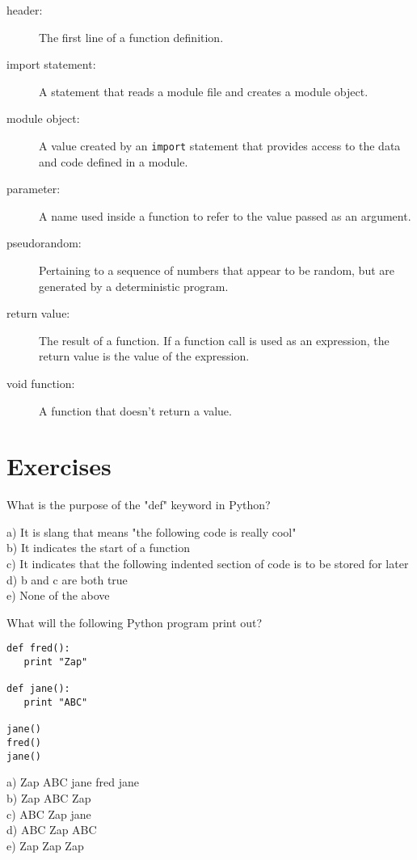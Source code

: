 \begin{description}
\item[header:] The first line of a function definition.

\item[import statement:] A statement that reads a module file and creates
a module object.

\item[module object:] A value created by an {\tt import} statement
that provides access to the data and code defined in a module.

\item[parameter:] A name used inside a function to refer to the value
passed as an argument.

\item[pseudorandom:] Pertaining to a sequence of numbers that appear
to be random, but are generated by a deterministic program.

\item[return value:]  The result of a function.  If a function call
is used as an expression, the return value is the value of
the expression.

\item[void function:] A function that doesn't return a value.


\end{description}


\section{Exercises}

\begin{ex}
What is the purpose of the "def" keyword in Python?

a) It is slang that means "the following code is really cool"\\
b) It indicates the start of a function\\
c) It indicates that the following indented section of code is to be stored for later\\
d) b and c are both true\\
e) None of the above
\end{ex}

\begin{ex}
What will the following Python program print out?

\beforeverb
\begin{verbatim}
def fred():
   print "Zap"

def jane():
   print "ABC"

jane()
fred()
jane()
\end{verbatim}
\afterverb
%
a) Zap ABC jane fred jane\\
b) Zap ABC Zap\\
c) ABC Zap jane\\
d) ABC Zap ABC\\
e) Zap Zap Zap
\end{ex}

